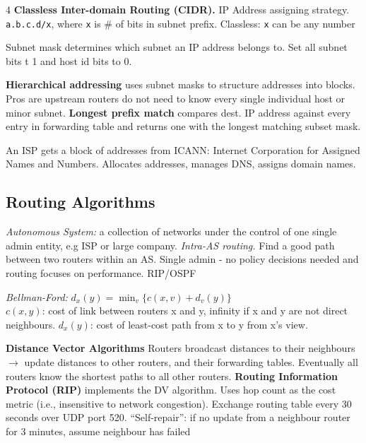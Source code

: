 \documentclass[10pt]{extarticle}
\begin{document}
\begin{multicols}{4}
\textbf{Classless Inter-domain Routing (CIDR).} IP Address assigning strategy.
\texttt{a.b.c.d/x}, where \texttt{x} is \# of bits in subnet prefix. Classless: \texttt{x} can be any number

Subnet mask determines which subnet an IP address belongs to. Set all subnet bits t 1 and host id bits to 0.

\textbf{Hierarchical addressing} uses subnet masks to structure addresses into blocks. Pros are upstream routers do not need to know every single individual host or minor subnet.
\textbf{Longest prefix match} compares dest. IP address against every entry in forwarding table and returns one with the longest matching subset mask.

An ISP gets a block of addresses from ICANN: Internet Corporation for Assigned Names and Numbers. Allocates addresses, manages DNS, assigns domain names.

\subsection{Routing Algorithms}
\textit{Autonomous System: }a collection of networks under the control of one single admin entity, e.g ISP or large company.
\textit{Intra-AS routing.} Find a good path between two routers within an AS. Single admin - no policy decisions needed and routing focuses on performance. RIP/OSPF

\textit{Bellman-Ford: }$d_x(y) = \min_v{\{c(x, v)+ d_v(y)\}}$\\
$c(x, y)$: cost of link between routers x and y, infinity if x and y are not direct neighbours. $d_x(y)$: cost of least-cost path from x to y from x’s view.

\textbf{Distance Vector Algorithms} Routers broadcast distances to their neighbours $\rightarrow$ update distances to other routers, and their forwarding tables. Eventually all routers know the shortest paths to all other routers.
\textbf{Routing Information Protocol (RIP)} implements the DV algorithm. Uses hop count as the cost metric (i.e., insensitive to network congestion).
Exchange routing table every 30 seconds over UDP port 520.
“Self-repair”: if no update from a neighbour router for 3 minutes, assume neighbour has failed


\end{multicols}
\end{document}
